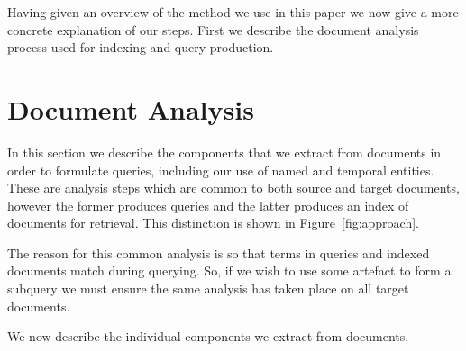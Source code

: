 \documentclass{mpaper}
\begin{document}
Having given an overview of the method we use in this paper we now give a more concrete explanation of our steps. First we describe the document analysis process used for indexing and query production.

\section{Document Analysis} \label{sec:components}
In this section we describe the components that we extract from documents in order to formulate queries, including our use of named and temporal entities.
These are analysis steps which are common to both source and target documents, however the former produces queries and the latter produces an index of documents for retrieval. This distinction is shown in Figure~\ref{fig:approach}.

The reason for this common analysis is so that terms in queries and indexed documents match during querying. So, if we wish to use some artefact to form a subquery we must ensure the same analysis has taken place on all target documents.
 
We now describe the individual components we extract from documents.
\end{document}

